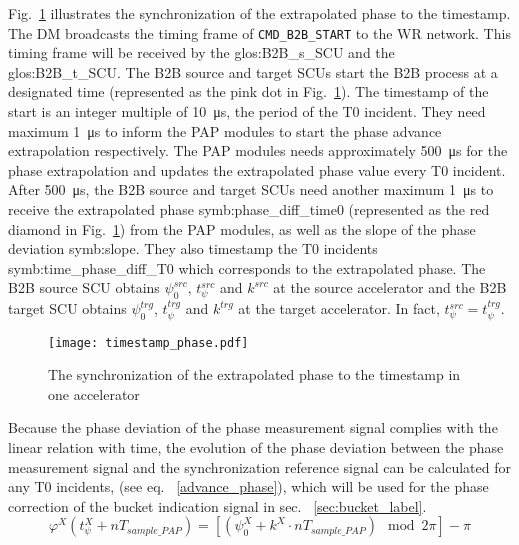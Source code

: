 Fig.~\ref{phase_diff_syn_time} illustrates the synchronization of the extrapolated phase to the timestamp. The DM broadcasts the timing frame of \verb|CMD_B2B_START| to the WR network. This timing frame will be received by the \gls{glos:B2B_s_SCU} and the \gls{glos:B2B_t_SCU}. The B2B source and target SCUs start the B2B process at a designated time (represented as the pink dot in Fig.~\ref{phase_diff_syn_time}). The timestamp of the start is an integer multiple of \SI{10}{\us}, the period of the T0 incident. They need maximum \SI{1}{\us} to inform the PAP modules to start the phase advance extrapolation respectively. The PAP modules needs approximately \SI{500}{\us} for the phase extrapolation and updates the extrapolated phase value every T0 incident. After \SI{500}{\us}, the B2B source and target SCUs need another maximum \SI{1}{\us} to receive the extrapolated phase \gls{symb:phase_diff_time0} (represented as the red diamond in Fig.~\ref{phase_diff_syn_time}) from the PAP modules, as well as the slope of the phase deviation \gls{symb:slope}. They also timestamp the T0 incidents \gls{symb:time_phase_diff_T0} which corresponds to the extrapolated phase. The B2B source SCU obtains $\psi^\mathit{src}_0$, $t_\psi^\mathit{src}$ and $k^\mathit{src}$ at the source accelerator and the B2B target SCU obtains $\psi^\mathit{trg}_0$, $t_\psi^\mathit{trg}$ and $k^\mathit{trg}$ at the target accelerator. In fact, $t_\psi^\mathit{src}=t_\psi^\mathit{trg}$.
 \begin{figure}[!htb]
   \centering   
   \texttt{[image: timestamp\_phase.pdf]}
   \caption{The synchronization of the extrapolated phase to the timestamp in one accelerator}
   \label{phase_diff_syn_time}
\end{figure}

Because the phase deviation of the phase measurement signal complies with the linear relation with time, the evolution of the phase deviation between the phase measurement signal and the synchronization reference signal can be calculated for any T0 incidents, (see eq. ~\ref{advance_phase}), which will be used for the phase correction of the bucket indication signal in sec. ~\ref{sec:bucket_label}.
\begin{equation}
\label{advance_phase}
\varphi^\mathit{X}(t_\mathit{\psi}^\mathit{X}+nT_\mathit{sample\_PAP})=[(\psi^\mathit{X}_0+k^\mathit{X}\cdot nT_\mathit{sample\_PAP}) \mod 2\pi] - \pi
\end{equation}

